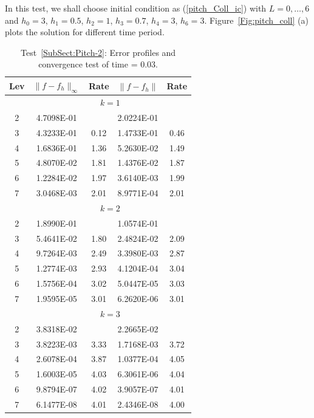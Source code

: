 \documentclass[preprint,11pt]{elsarticle}
\begin{document}
 In this test, we shall choose initial condition as (\ref{pitch_Coll_ic}) with $L=0,\dots,6$ and $h_0=3$,  $h_1=0.5$,  $h_2=1$,  $h_3=0.7$,  $h_4=3$,  $h_6=3$.
Figure~\ref{Fig:pitch_coll} (a) plots the solution for different time period.

\begin{table}[H]
\caption{Test~\ref{SubSect:Pitch-2}: Error profiles and convergence test of time = $0.03$.}\label{Tab:pitch_coll}
\centering
\begin{tabular}{c|cc|cc}	\hline\hline
Lev & $\|f-f_h\|_{\infty}$ & Rate & $\|f-f_h\|$ & Rate \\ \hline		
&\multicolumn{4}{c}{$k=1$}\\ \hline
2	&4.7098E-01	&	&2.0224E-01	&\\
3	&4.3233E-01	&0.12	&1.4733E-01	&0.46\\
4	&1.6836E-01	&1.36	&5.2630E-02	&1.49\\
5	&4.8070E-02	&1.81	&1.4376E-02	&1.87\\
6	&1.2284E-02	&1.97	&3.6140E-03	&1.99\\
7	&3.0468E-03	&2.01	&8.9771E-04	&2.01\\ \hline		
&\multicolumn{4}{c}{$k=2$}\\ \hline
2	&1.8990E-01	&	&1.0574E-01 &	\\
3	&5.4641E-02	&1.80	&2.4824E-02	&2.09\\
4	&9.7264E-03	&2.49	&3.3980E-03	&2.87\\
5	&1.2774E-03	&2.93	&4.1204E-04	&3.04\\
6	&1.5756E-04	&3.02	&5.0447E-05	&3.03\\
7	&1.9595E-05	&3.01	&6.2620E-06	&3.01\\ \hline		
&\multicolumn{4}{c}{$k=3$}\\ \hline
2	&3.8318E-02	&	&2.2665E-02	&\\
3	&3.8223E-03	&3.33	&1.7168E-03	&3.72\\
4	&2.6078E-04	&3.87	&1.0377E-04	&4.05\\
5	&1.6003E-05	&4.03	&6.3061E-06	&4.04\\
6	&9.8794E-07	&4.02	&3.9057E-07	&4.01\\
7	&6.1477E-08	&4.01	&2.4346E-08	&4.00\\ \hline\hline
\end{tabular}
\end{table}
\end{document}

